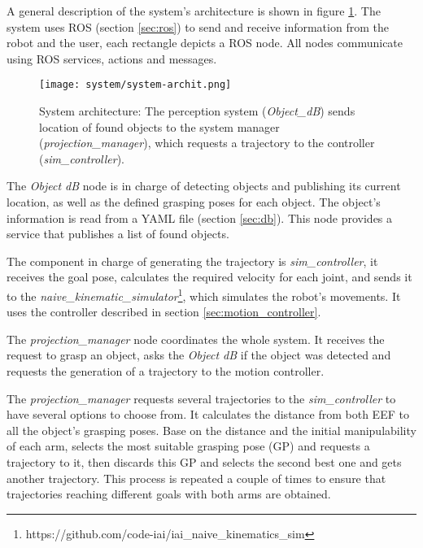 A general description of the system's architecture is shown in figure \ref{fig:sys_arch}. The system uses ROS (section \ref{sec:ros}) to send and receive information from the robot and the user, each rectangle depicts a ROS node. All nodes communicate using ROS services, actions and messages.

\begin{figure}[H]
	\centering
	\texttt{[image: system/system-archit.png]}
	\vspace{-10pt}
	\caption[System architecture] {System architecture: The perception system (\textit{Object\_dB}) sends location of found objects to the system manager (\textit{projection\_manager}), which requests a trajectory to the controller (\textit{sim\_controller}).}
	\vspace{-15pt}
	\label{fig:sys_arch}
\end{figure}

The \textit{Object dB} node is in charge of detecting objects and publishing its current location, as well as the defined grasping poses for each object. The object's information is read from a YAML file (section \ref{sec:db}). This node provides a service that publishes a list of found objects.

The component in charge of generating the trajectory is \textit{sim\_controller}, it receives the goal pose, calculates the required velocity for each joint, and sends it to the \textit{naive\_kinematic\_simulator}\footnote{https://github.com/code-iai/iai\_naive\_kinematics\_sim}, which simulates the robot's movements. It uses the controller described in section \ref{sec:motion_controller}.

The \textit{projection\_manager} node coordinates the whole system. It receives the request to grasp an object, asks the \textit{Object dB} if the object was detected and requests the generation of a trajectory to the motion controller. 

The \textit{projection\_manager} requests several trajectories to the \textit{sim\_controller} to have several options to choose from. It calculates the distance from both EEF to all the object's grasping poses. Base on the distance and the initial manipulability of each arm, selects the most suitable grasping pose (GP) and requests a trajectory to it, then discards this GP and selects the second best one and gets another trajectory. This process is repeated a couple of times to ensure that trajectories reaching different goals with both arms are obtained.

